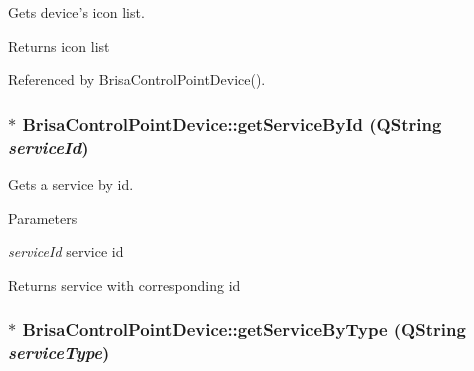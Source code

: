 Gets device's icon list. \begin{DoxyReturn}{Returns}
icon list 
\end{DoxyReturn}


Referenced by BrisaControlPointDevice().\hypertarget{classBrisaUpnp_1_1BrisaControlPointDevice_aca17b2f4f228ad68da6ed1861b8ea4c4}{
\subsubsection[{getServiceById}]{ $\ast$ BrisaControlPointDevice::getServiceById (QString {\em serviceId})}}
\label{classBrisaUpnp_1_1BrisaControlPointDevice_aca17b2f4f228ad68da6ed1861b8ea4c4}


Gets a service by id. 
\begin{DoxyParams}{Parameters}
\item[{\em serviceId}]service id \end{DoxyParams}
\begin{DoxyReturn}{Returns}
service with corresponding id 
\end{DoxyReturn}
\hypertarget{classBrisaUpnp_1_1BrisaControlPointDevice_ae89c14d455a11f82fa8eeba2d97e2f74}{
\subsubsection[{getServiceByType}]{ $\ast$ BrisaControlPointDevice::getServiceByType (QString {\em serviceType})}}
\label{classBrisaUpnp_1_1BrisaControlPointDevice_ae89c14d455a11f82fa8eeba2d97e2f74}


